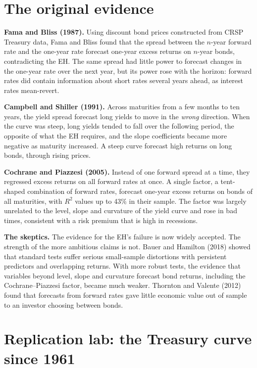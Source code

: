 \section{The original evidence}
\label{sec:16-evidence}

\textbf{Fama and Bliss (1987).} Using discount bond prices constructed from CRSP Treasury data, Fama and Bliss found that the spread between the $n$-year forward rate and the one-year rate forecast one-year excess returns on $n$-year bonds, contradicting the EH. The same spread had little power to forecast changes in the one-year rate over the next year, but its power rose with the horizon: forward rates did contain information about short rates several years ahead, as interest rates mean-revert.

\textbf{Campbell and Shiller (1991).} Across maturities from a few months to ten years, the yield spread forecast long yields to move in the \emph{wrong} direction. When the curve was steep, long yields tended to fall over the following period, the opposite of what the EH requires, and the slope coefficients became more negative as maturity increased. A steep curve forecast high returns on long bonds, through rising prices.

\textbf{Cochrane and Piazzesi (2005).} Instead of one forward spread at a time, they regressed excess returns on all forward rates at once. A single factor, a tent-shaped combination of forward rates, forecast one-year excess returns on bonds of all maturities, with $R^2$ values up to 43\% in their sample. The factor was largely unrelated to the level, slope and curvature of the yield curve and rose in bad times, consistent with a risk premium that is high in recessions.

\textbf{The skeptics.} The evidence for the EH's failure is now widely accepted. The strength of the more ambitious claims is not. Bauer and Hamilton (2018) showed that standard tests suffer serious small-sample distortions with persistent predictors and overlapping returns. With more robust tests, the evidence that variables beyond level, slope and curvature forecast bond returns, including the Cochrane--Piazzesi factor, became much weaker. Thornton and Valente (2012) found that forecasts from forward rates gave little economic value out of sample to an investor choosing between bonds.

\section{Replication lab: the Treasury curve since 1961}
\label{sec:16-lab}

